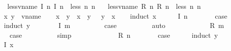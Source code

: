 \begin{isabellebody}
\ \ {\isachardoublequoteopen}less{\isacharunderscore}vname\ {\isacharparenleft}I\ n{}{\isacharparenright}\ {\isacharparenleft}I\ n{}{\isacharparenright}\ {\isacharequal}\ less\ n{}\ n{}{\isachardoublequoteclose}\ {\isacharbar}\isanewline
\ \ {\isachardoublequoteopen}less{\isacharunderscore}vname\ {\isacharparenleft}R\ n{}{\isacharparenright}\ {\isacharparenleft}R\ n{}{\isacharparenright}\ {\isacharequal}\ less\ n{}\ n{}{\isachardoublequoteclose}\isanewline
\isanewline
{}\isamarkupfalse%
%
\isadelimproof
\ %
\endisadelimproof
%
\isatagproof
{}\isamarkupfalse%
\isanewline
\ \ \isamarkupfalse%
\ x\ y\ {\isacharcolon}{\isacharcolon}\ vname\isanewline
\ \ \isamarkupfalse%
\ {\isachardoublequoteopen}{\isacharparenleft}x\ {\isacharless}\ y{\isacharparenright}\ {\isacharequal}\ {\isacharparenleft}x\ {\isasymle}\ y\ {\isasymand}\ {\isasymnot}\ y\ {\isasymle}\ x{\isacharparenright}{\isachardoublequoteclose}\isanewline
\ \ \isamarkupfalse%
\ {\isacharparenleft}induct\ x{\isacharparenright}\isanewline
\ \ \ \ \isamarkupfalse%
\ {\isacharparenleft}I\ n{\isacharparenright}\isanewline
\ \ \ \ \isamarkupfalse%
\ \isamarkupfalse%
\ {\isacharquery}case\isanewline
\ \ \ \ \isamarkupfalse%
\ {\isacharparenleft}induct\ y{\isacharparenright}\isanewline
\ \ \ \ \ \ \isamarkupfalse%
\ {\isacharparenleft}I\ m{\isacharparenright}\isanewline
\ \ \ \ \ \ \isamarkupfalse%
\ \isamarkupfalse%
\ {\isacharquery}case\isanewline
\ \ \ \ \ \ \ \ \isamarkupfalse%
\ auto\isanewline
\ \ \ \ \isamarkupfalse%
\isanewline
\ \ \ \ \ \ \isamarkupfalse%
\ {\isacharparenleft}R\ m{\isacharparenright}\isanewline
\ \ \ \ \ \ \isamarkupfalse%
\ \isamarkupfalse%
\ {\isacharquery}case\isanewline
\ \ \ \ \ \ \ \ \isamarkupfalse%
\ simp\isanewline
\ \ \ \ \isamarkupfalse%
\isanewline
\ \ \isamarkupfalse%
\isanewline
\ \ \ \ \isamarkupfalse%
\ {\isacharparenleft}R\ n{\isacharparenright}\isanewline
\ \ \ \ \isamarkupfalse%
\ \isamarkupfalse%
\ {\isacharquery}case\isanewline
\ \ \ \ \isamarkupfalse%
\ {\isacharparenleft}induct\ y{\isacharparenright}\isanewline
\ \ \ \ \ \ \isamarkupfalse%
\ {\isacharparenleft}I\ x{\isacharparenright}\isanewline

\end{isabellebody}
